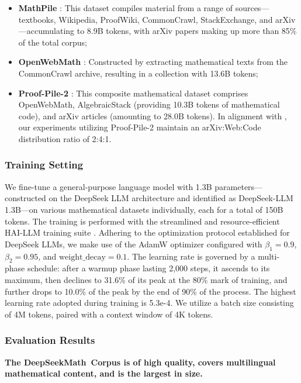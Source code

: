 \begin{itemize}[topsep=0pt]
\begin{itemize}[topsep=0pt]
    \item \textbf{MathPile} \citep{mathpile}: This dataset compiles material from a range of sources—textbooks, Wikipedia, ProofWiki, CommonCrawl, StackExchange, and arXiv—accumulating to 8.9B tokens, with arXiv papers making up more than 85\% of the total corpus;
    \item \textbf{OpenWebMath} \citep{openwebmath}: Constructed by extracting mathematical texts from the CommonCrawl archive, resulting in a collection with 13.6B tokens;
    \item \textbf{Proof-Pile-2} \citep{llemma}: This composite mathematical dataset comprises OpenWebMath, AlgebraicStack (providing 10.3B tokens of mathematical code), and arXiv articles (amounting to 28.0B tokens). In alignment with \cite{llemma}, our experiments utilizing Proof-Pile-2 maintain an arXiv:Web:Code distribution ratio of 2:4:1.
\end{itemize}

\subsubsection{Training Setting}
\label{sec:quality-policy}
We fine-tune a general-purpose language model with 1.3B parameters—constructed on the DeepSeek LLM architecture \citep{deepseek-llm} and identified as DeepSeek-LLM 1.3B—on various mathematical datasets individually, each for a total of 150B tokens. The training is performed with the streamlined and resource-efficient HAI-LLM training suite \citep{haillm}. Adhering to the optimization protocol established for DeepSeek LLMs, we make use of the AdamW optimizer \citep{adamW} configured with $\beta_1=0.9$, $\beta_2=0.95$, and $\mathrm{weight\_decay}=0.1$. The learning rate is governed by a multi-phase schedule: after a warmup phase lasting 2,000 steps, it ascends to its maximum, then declines to 31.6\% of its peak at the 80\% mark of training, and further drops to 10.0\% of the peak by the end of 90\% of the process. The highest learning rate adopted during training is 5.3e-4. We utilize a batch size consisting of 4M tokens, paired with a context window of 4K tokens.

\subsubsection{Evaluation Results}

\textbf{The DeepSeekMath~Corpus is of high quality, covers multilingual mathematical content, and is the largest in size.}


\end{itemize}
